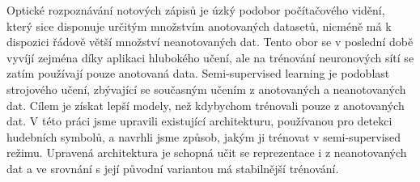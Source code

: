 \documentclass[12pt]{report}
\begin{document}

Optické rozpoznávání notových zápisů je úzký podobor počítačového vidění, který sice disponuje určitým množstvím anotovaných datasetů, nicméně má k dispozici řádově větší množství neanotovaných dat. Tento obor se v poslední době vyvíjí zejména díky aplikaci hlubokého učení, ale na trénování neuronových sítí se zatím používají pouze anotovaná data. Semi-supervised learning je podoblast strojového učení, zbývající se současným učením z anotovaných a neanotovaných dat. Cílem je získat lepší modely, než kdybychom trénovali pouze z anotovaných dat. V této práci jsme upravili existující architekturu, používanou pro detekci hudebních symbolů, a navrhli jsme způsob, jakým ji trénovat v semi-supervised režimu. Upravená architektura je schopná učit se reprezentace i z neanotovaných dat a ve srovnání s její původní variantou má stabilnější trénování.
\end{document}
